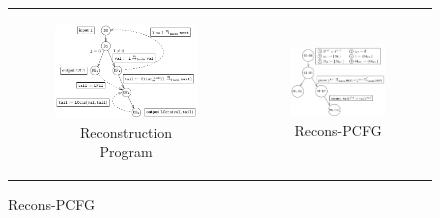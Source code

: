 \begin{figure}[t]
\begin{tabular}{cc}
\begin{subfigure}[b]{0.49\textwidth}
\includegraphics[scale=0.8]{chapters/figures/figClistCfg.pdf}
\vspace{3px}
\caption{\label{fig:reconsProg}Reconstruction Program}
\end{subfigure}%
&
\begin{subfigure}[b]{0.51\textwidth}
\includegraphics[scale=0.85]{chapters/figures/figClistProductCfg.pdf}
\vspace{17px}
\caption{\label{fig:reconsPCFG}Recons-PCFG}
\end{subfigure}%

\end{tabular}
\end{figure}
